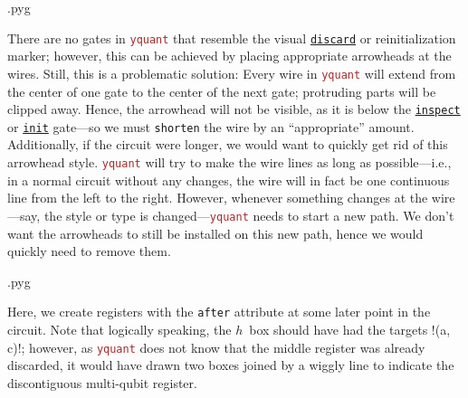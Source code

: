 \documentclass{scrartcl}
\makeatletter
\newenvironment{codeexample}{%
   \VerbatimEnvironment%
   \let\FVB@VerbatimOut\minted@FVB@VerbatimOut
   \let\FVE@VerbatimOut\minted@FVE@VerbatimOut
   \minted@configlang{tex}%
   \minted@fvset
   \begin{VerbatimOut}[codes={\catcode`\^^I=12},firstline,lastline]{\minted@jobname.pyg}%
}{
   \end{VerbatimOut}%
   \minted@langlinenoson%
   \savebox\codeexamplebox{ \minted@jobname.pyg}%
   \ifdim\wd\codeexamplebox>\dimexpr.5\linewidth-3mm\relax%
      \wd\codeexamplebox=.5\linewidth%
   \else%
      \wd\codeexamplebox=\dimexpr\wd\codeexamplebox+3mm\relax%
   \fi%
   \noindent\begin{minipage}{\wd\codeexamplebox}%
      \centering%
      \usebox\codeexamplebox%
   \end{minipage}%
   \begin{minipage}{\dimexpr\linewidth-\wd\codeexamplebox\relax}%
      \expandafter\minted@pygmentize\expandafter{\minted@lang}%
   \end{minipage}%
   \minted@langlinenosoff%
   \par%
}
\def\pkg#1{\textcolor{brown}{\texttt{#1}}}
\def\gate#1{\hyperref[gate:#1]{\texttt{#1}}}
\def\Yquant{\pkg{yquant}}
\makeatother
\begin{document}
            \begin{example}
               \begin{codeexample}
               \end{codeexample}
               There are no gates in \Yquant{} that resemble the visual \gate{discard} or reinitialization marker; however, this can be achieved by placing appropriate arrowheads at the wires.
               Still, this is a problematic solution: Every wire in \Yquant{} will extend from the center of one gate to the center of the next gate; protruding parts will be clipped away.
               Hence, the arrowhead will not be visible, as it is below the \gate{inspect} or \gate{init} gate---so we must \texttt{shorten} the wire by an ``appropriate'' amount.
               Additionally, if the circuit were longer, we would want to quickly get rid of this arrowhead style.
               \Yquant{} will try to make the wire lines as long as possible---i.e., in a normal circuit without any changes, the wire will in fact be one continuous line from the left to the right.
               However, whenever something changes at the wire---say, the style or type is changed---\Yquant{} needs to start a new path.
               We don't want the arrowheads to still be installed on this new path, hence we would quickly need to remove them.
            \end{example}

            \begin{example}
               \begin{codeexample}
               \end{codeexample}
               Here, we create registers with the \texttt{after} attribute at some later point in the circuit.
               Note that logically speaking, the $h$~box should have had the targets \yquant!(a, c)!; however, as \Yquant{} does not know that the middle register was already discarded, it would have drawn two boxes joined by a wiggly line to indicate the discontiguous multi\hyp qubit register.
            \end{example}
\end{document}
